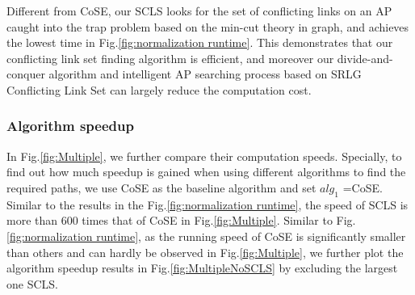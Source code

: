 
Different from CoSE, our SCLS looks for the set of conflicting links on an AP caught into the trap problem based on the min-cut theory in graph, and achieves the lowest time in Fig.\ref{fig:normalization runtime}. This demonstrates that our conflicting link set finding algorithm is efficient, and moreover our divide-and-conquer algorithm and intelligent AP searching process based on SRLG Conflicting Link Set can largely reduce the computation cost.


\subsubsection{Algorithm speedup}

In Fig.\ref{fig:Multiple}, we further compare their computation speeds. Specially, to find out how much speedup is gained when using different algorithms to find the required paths,
we use CoSE as the baseline algorithm and set $alg_1$ =CoSE. Similar to the results in the Fig.\ref{fig:normalization runtime}, the speed of SCLS is more than 600 times that of  CoSE in Fig.\ref{fig:Multiple}.  Similar to Fig.\ref{fig:normalization runtime}, as the running speed of CoSE is significantly smaller than others and can hardly be observed in Fig.\ref{fig:Multiple}, we further plot the algorithm speedup results in Fig.\ref{fig:MultipleNoSCLS} by excluding the largest one SCLS.



